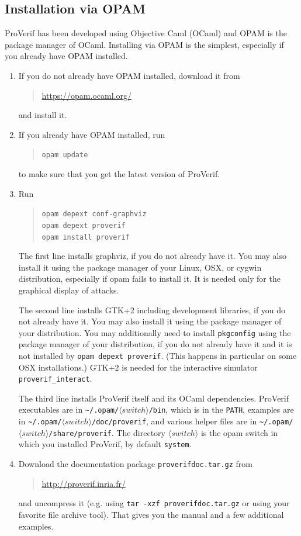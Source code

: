 \documentclass{book}
\newcommand{\nonterm}[1]{\langle\mathit{#1}\rangle}
\newcommand{\switchdir}{\nonterm{switch}}
\newcommand{\opamsubdir}[1]{\nolinkurl{~/.opam/}$\switchdir$\nolinkurl{/#1}}
\begin{document}
\subsection{Installation via OPAM}

ProVerif has been developed using Objective Caml (OCaml) and OPAM is
the package manager of OCaml. Installing via OPAM is the simplest,
especially if you already have OPAM installed.
\begin{enumerate}

\item If you do not already have OPAM installed, download it from
\begin{quote}
	\url{https://opam.ocaml.org/}
\end{quote}
and install it.

\item If you already have OPAM installed, run
\begin{quote}
\texttt{opam update}
\end{quote}
to make sure that you get the latest version of ProVerif.

\item Run
\begin{quote}
\texttt{opam depext conf-graphviz}\\
\texttt{opam depext proverif}\\
\texttt{opam install proverif}
\end{quote}
The first line installs graphviz, if you do not already have it. You may also install it using the package manager of your Linux, OSX, or cygwin distribution, especially if opam fails to install it. It is needed only for the graphical display of attacks.

The second line installs GTK+2 including development libraries, if you do not already have it. You may also install it using the package manager of your distribution.  You may additionally need to install \texttt{pkgconfig} using the package manager of your distribution, if you do not already have it and it is not installed by \texttt{opam depext proverif}. (This happens in particular on some OSX installations.) GTK+2 is needed for the interactive simulator \texttt{proverif\_interact}.

The third line installs ProVerif itself and its OCaml dependencies. ProVerif executables are in
\opamsubdir{bin}, which is in the {\tt PATH},
examples are in \opamsubdir{doc/proverif},
and various helper files are in \opamsubdir{share/proverif}.
The directory $\switchdir$ is the opam switch in which you installed
ProVerif, by default \texttt{system}.

\item Download the documentation package \texttt{proverifdoc\V.tar.gz}
from
\begin{quote}
	\url{http://proverif.inria.fr/}
\end{quote}
and uncompress it (e.g. using \texttt{tar -xzf proverifdoc\V.tar.gz} or using
your favorite file archive tool). That gives you the manual and a few additional
examples.

\end{enumerate}
\end{document}
